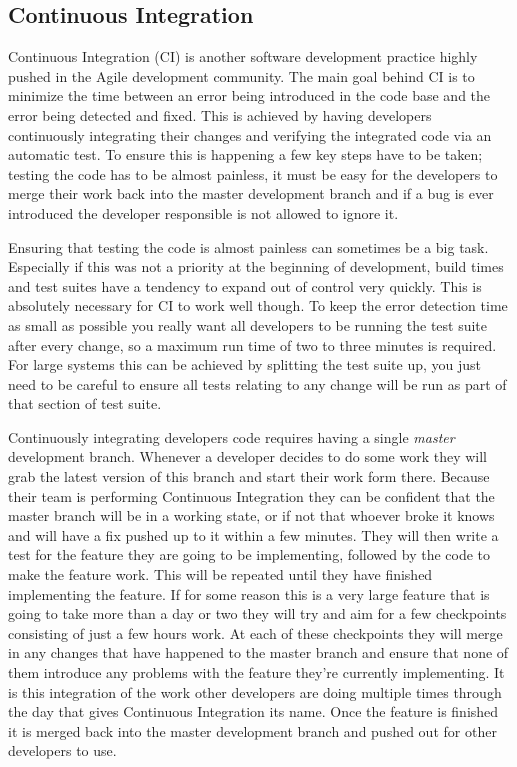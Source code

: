 \subsection{Continuous Integration}

  Continuous Integration (CI) is another software development practice highly
  pushed in the Agile development community.  The main goal behind CI is to
  minimize the time between an error being introduced in the code base and the
  error being detected and fixed.  This is achieved by having developers
  continuously integrating their changes and verifying the integrated code via
  an automatic test.  To ensure this is happening a few key steps have to be
  taken; testing the code has to be almost painless, it must be easy for the
  developers to merge their work back into the master development branch and if
  a bug is ever introduced the developer responsible is not allowed to ignore
  it.

  Ensuring that testing the code is almost painless can sometimes be a big task.
  Especially if this was not a priority at the beginning of development, build
  times and test suites have a tendency to expand out of control very quickly.
  This is absolutely necessary for CI to work well though.  To keep the error
  detection time as small as possible you really want all developers to be
  running the test suite after every change, so a maximum run time of two to
  three minutes is required.  For large systems this can be achieved by
  splitting the test suite up, you just need to be careful to ensure all tests
  relating to any change will be run as part of that section of test suite.

  Continuously integrating developers code requires having a single
  \emph{master} development branch.  Whenever a developer decides to do some
  work they will grab the latest version of this branch and start their work
  form there.  Because their team is performing Continuous Integration they can
  be confident that the master branch will be in a working state, or if not that
  whoever broke it knows and will have a fix pushed up to it within a few
  minutes.  They will then write a test for the feature they are going to be
  implementing, followed by the code to make the feature work.  This will be
  repeated until they have finished implementing the feature.  If for some
  reason this is a very large feature that is going to take more than a day or
  two they will try and aim for a few checkpoints consisting of just a few hours
  work.  At each of these checkpoints they will merge in any changes that have
  happened to the master branch and ensure that none of them introduce any
  problems with the feature they're currently implementing.  It is this
  integration of the work other developers are doing multiple times through the
  day that gives Continuous Integration its name.  Once the feature is finished
  it is merged back into the master development branch and pushed out for other
  developers to use.

